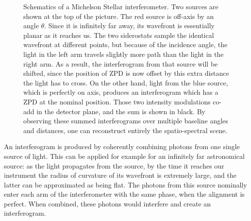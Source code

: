 \begin{figure}[!h]
	\centering
	
	\caption[Michelson Stellar interferometer]{Schematics of a Michelson Stellar interferometer. Two sources are shown at the top of the picture. The red source is off-axis by an angle $\theta$. Since it is infinitely far away, its wavefront is essentially planar as it reaches us. The two siderostats sample the identical wavefront at different points, but because of the incidence angle, the light in the left arm travels slightly more path than the light in the right arm. As a result, the interferogram from that source will be shifted, since the position of ZPD is now offset by this extra distance the light has to cross. On the other hand, light from the blue source, which is perfectly on axis, produces an interferogram which has a ZPD at the nominal position. Those two intensity modulations co-add in the detector plane, and the sum is shown in black. By observing these summed interferograms over multiple baseline angles and distances, one can reconstruct entirely the spatio-spectral scene.}
	\label{fig:interferometer}
    \end{figure}


An interferogram is produced by coherently combining photons from one single source of light. This can be applied for example for an infinitely far astronomical source: as the light propagates from the source, by the time it reaches our instrument the radius of curvature of its wavefront is extremely large, and the latter can be approximated as being flat. The photons from this source nominally enter each arm of the interferometer with the same phase, when the alignment is perfect. When combined, these photons would interfere and create an interferogram.

